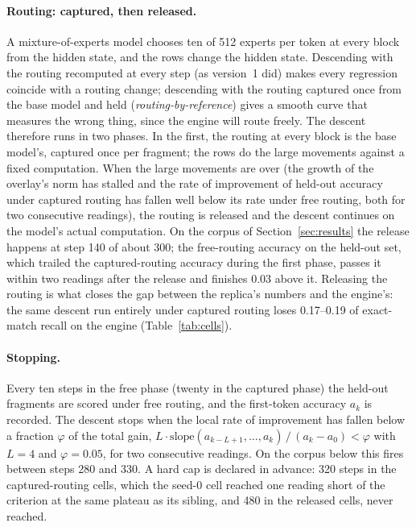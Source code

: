 \documentclass[10pt,a4paper]{article}
\begin{document}
\paragraph{Routing: captured, then released.} A mixture-of-experts model chooses ten of
512 experts per token at every block from the hidden state, and the rows change the hidden
state. Descending with the routing recomputed at every step (as version~1 did) makes
every regression coincide with a routing change; descending with the routing captured
once from the base model and held (\emph{routing-by-reference}) gives a smooth curve that
measures the wrong thing, since the engine will route freely. The descent therefore runs
in two phases. In the first, the routing at every block is the base model's, captured
once per fragment; the rows do the large movements against a fixed computation. When the
large movements are over (the growth of the overlay's norm has stalled and the rate of
improvement of held-out accuracy under captured routing has fallen well below its rate
under free routing, both for two consecutive readings), the routing is released and the
descent continues on the model's actual computation. On the corpus of
Section~\ref{sec:results} the release happens at step 140 of about 300; the free-routing
accuracy on the held-out set, which trailed the captured-routing accuracy during the first
phase, passes it within two readings after the release and finishes 0.03 above it.
Releasing the routing is what closes the gap between the replica's numbers and the
engine's: the same descent run entirely under captured routing loses 0.17--0.19 of
exact-match recall on the engine (Table~\ref{tab:cells}).

\paragraph{Stopping.} Every ten steps in the free phase (twenty in the captured phase)
the held-out fragments are scored under free routing, and the first-token accuracy $a_k$
is recorded. The descent stops when the local rate of improvement has fallen below a
fraction $\varphi$ of the total gain,
$L\cdot\text{slope}(a_{k-L+1},\dots,a_k)\,/\,(a_k - a_0) < \varphi$ with $L=4$ and
$\varphi=0.05$, for two consecutive readings. On the corpus below this fires between
steps 280 and 330. A hard cap is declared in advance: 320 steps in the captured-routing
cells, which the seed-0 cell reached one reading short of the criterion at the same
plateau as its sibling, and 480 in the released cells, never reached.
\end{document}
